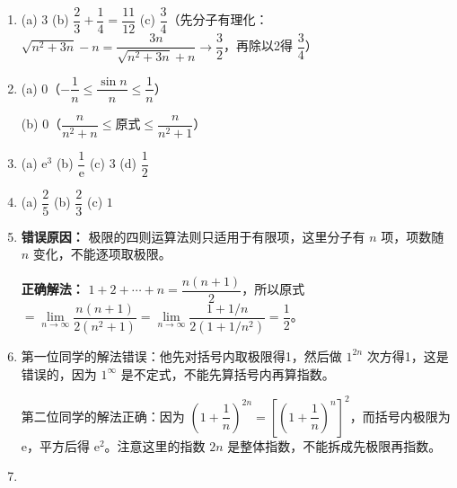 \documentclass[fontset=fandol]{ctexart}
\newcommand{\ee}{\mathrm{e}}
\begin{document}
\begin{enumerate}

\item[1.] 

   (a) \(3\) \quad (b) \(\dfrac{2}{3} + \dfrac{1}{4} = \dfrac{11}{12}\) \quad (c) \(\dfrac{3}{4}\)（先分子有理化：\(\sqrt{n^2+3n} - n = \dfrac{3n}{\sqrt{n^2+3n}+n} \to \dfrac{3}{2}\)，再除以2得 \(\dfrac{3}{4}\)）



\item[2.] 

   (a) \(0\)（\(-\dfrac{1}{n} \leq \dfrac{\sin n}{n} \leq \dfrac{1}{n}\)）\quad 

   (b) \(0\)（\(\dfrac{n}{n^2+n} \leq \text{原式} \leq \dfrac{n}{n^2+1}\)）



\item[3.] 

(a) \(\ee^3\) \quad (b) \(\dfrac{1}{\ee}\) \quad (c) \(3\) \quad (d) \(\dfrac{1}{2}\)



\item[4.] 

   (a) \(\dfrac{2}{5}\) \quad (b) \(\dfrac{2}{3}\) \quad (c) \(1\)



\item[5.] 

   \textbf{错误原因：} 极限的四则运算法则只适用于有限项，这里分子有 \(n\) 项，项数随 \(n\) 变化，不能逐项取极限。

   

   \textbf{正确解法：} \(1+2+\cdots+n = \dfrac{n(n+1)}{2}\)，所以原式 \(= \lim\limits_{n\to\infty} \dfrac{n(n+1)}{2(n^2+1)} = \lim\limits_{n\to\infty} \dfrac{1+1/n}{2(1+1/n^2)} = \dfrac{1}{2}\)。



\item[6.] 

   第一位同学的解法错误：他先对括号内取极限得1，然后做 \(1^{2n}\) 次方得1，这是错误的，因为 \(1^\infty\) 是不定式，不能先算括号内再算指数。

   

第二位同学的解法正确：因为 \(\left(1+\dfrac{1}{n}\right)^{2n} = \left[\left(1+\dfrac{1}{n}\right)^n\right]^2\)，而括号内极限为 \(\ee\)，平方后得 \(\ee^2\)。注意这里的指数 \(2n\) 是整体指数，不能拆成先极限再指数。



\item[7.] 


\end{enumerate}
\end{document}
